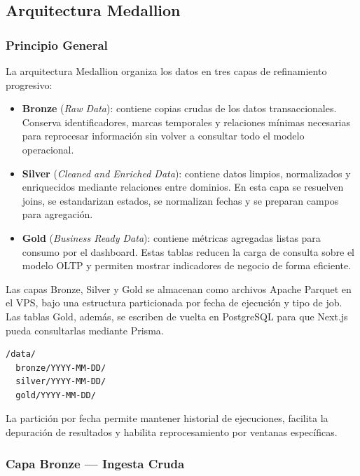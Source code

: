 \subsection{Arquitectura Medallion}

\subsubsection{Principio General}

La arquitectura Medallion organiza los datos en tres capas de refinamiento progresivo:

\begin{itemize}[leftmargin=1.5em]
  \item \textbf{Bronze} (\textit{Raw Data}): contiene copias crudas de los datos
  transaccionales. Conserva identificadores, marcas temporales y relaciones mínimas
  necesarias para reprocesar información sin volver a consultar todo el modelo operacional.

  \item \textbf{Silver} (\textit{Cleaned and Enriched Data}): contiene datos limpios,
  normalizados y enriquecidos mediante relaciones entre dominios. En esta capa se resuelven
  joins, se estandarizan estados, se normalizan fechas y se preparan campos para agregación.

  \item \textbf{Gold} (\textit{Business Ready Data}): contiene métricas agregadas listas
  para consumo por el dashboard. Estas tablas reducen la carga de consulta sobre el modelo
  OLTP y permiten mostrar indicadores de negocio de forma eficiente.
\end{itemize}

Las capas Bronze, Silver y Gold se almacenan como archivos Apache Parquet en el VPS, bajo
una estructura particionada por fecha de ejecución y tipo de job. Las tablas Gold, además,
se escriben de vuelta en PostgreSQL para que Next.js pueda consultarlas mediante Prisma.

\begin{verbatim}
/data/
  bronze/YYYY-MM-DD/
  silver/YYYY-MM-DD/
  gold/YYYY-MM-DD/
\end{verbatim}

La partición por fecha permite mantener historial de ejecuciones, facilita la depuración
de resultados y habilita reprocesamiento por ventanas específicas.

\subsubsection{Capa Bronze --- Ingesta Cruda}


